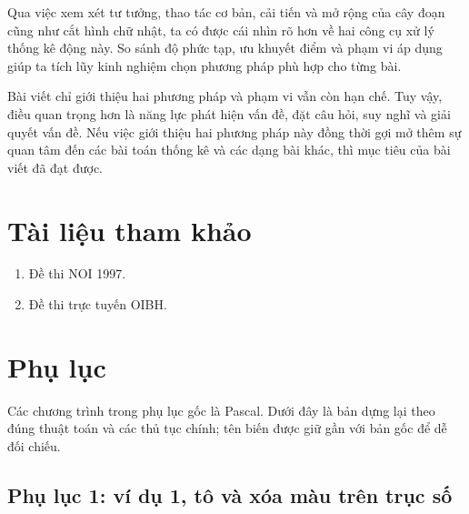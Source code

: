 \documentclass[11pt]{article}
\begin{document}
Qua việc xem xét tư tưởng, thao tác cơ bản, cải tiến và mở rộng của cây đoạn
cũng như cắt hình chữ nhật, ta có được cái nhìn rõ hơn về hai công cụ xử lý
thống kê động này. So sánh độ phức tạp, ưu khuyết điểm và phạm vi áp dụng
giúp ta tích lũy kinh nghiệm chọn phương pháp phù hợp cho từng bài.

Bài viết chỉ giới thiệu hai phương pháp và phạm vi vẫn còn hạn chế. Tuy vậy,
điều quan trọng hơn là năng lực phát hiện vấn đề, đặt câu hỏi, suy nghĩ và
giải quyết vấn đề. Nếu việc giới thiệu hai phương pháp này đồng thời gợi mở
thêm sự quan tâm đến các bài toán thống kê và các dạng bài khác, thì mục tiêu
của bài viết đã đạt được.

\section*{Tài liệu tham khảo}

\begin{enumerate}
  \item Đề thi NOI 1997.
  \item Đề thi trực tuyến OIBH.
\end{enumerate}

\section*{Phụ lục}

Các chương trình trong phụ lục gốc là Pascal. Dưới đây là bản dựng lại theo
đúng thuật toán và các thủ tục chính; tên biến được giữ gần với bản gốc để dễ
đối chiếu.

\subsection*{Phụ lục 1: ví dụ 1, tô và xóa màu trên trục số}
\end{document}
